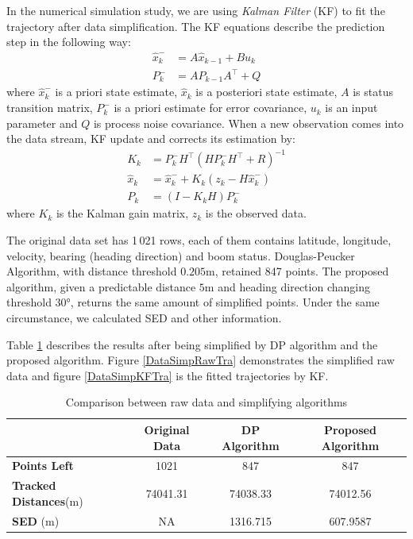 In the numerical simulation study, we are using \textit{Kalman Filter} (KF) to fit the trajectory after data simplification. The KF equations describe the prediction step in the following way: 
\begin{align*}
\hat{x}_k^-&=A\hat{x}_{k-1}+Bu_k \\
P_k^-&=AP_{k-1}A^\top+Q
\end{align*}
where $\hat{x}_k^-$ is a priori state estimate, $\hat{x}_k$ is a posteriori state estimate, $A$ is status transition matrix, $P_k^-$ is a priori estimate for error covariance, $u_k$ is an input parameter and $Q$ is process noise covariance. When a new observation comes into the data stream, KF update and corrects its estimation by: 
\begin{align*}
K_k&=P_k^-H^\top (HP_k^-H^\top+R)^{-1} \\
\hat{x}_k&=\hat{x}_k^-+K_k(z_k-H\hat{x}_k^-) \\
P_k&=(I-K_kH)P_k^-
\end{align*}
where $K_k$ is the Kalman gain matrix, $z_k$ is the observed data.


The original data set has 1\,021 rows, each of them contains latitude, longitude, velocity, bearing (heading direction) and boom status. Douglas-Peucker Algorithm, with distance threshold $0.205$m, retained 847 points. The proposed algorithm, given a predictable distance $5$m and heading direction changing threshold $\ang{30}$, returns the same amount of simplified points. Under the same circumstance, we calculated SED and other information. 

Table \ref{DataSimpCompTable} describes the results after being simplified by DP algorithm and the proposed algorithm. Figure \ref{DataSimpRawTra} demonstrates the simplified raw data and figure \ref{DataSimpKFTra} is the fitted trajectories by KF. 

\begin{table}
\centering
\caption{Comparison between raw data and simplifying algorithms}
\label{DataSimpCompTable}
\begin{tabular}{|l|c|c|c|}
\hline 
  & \textbf{Original Data} & \textbf{DP Algorithm} & \textbf{Proposed Algorithm}  \\
\hline 
\textbf{Points Left} & 1021              & 847         & 847         \\
\hline 
\textbf{Tracked Distances}(m)  & 74041.31     & 74038.33    & 74012.56     \\
\hline 
\textbf{SED} (m)    & NA        & 1316.715    & 607.9587   \\
\hline 
\end{tabular}
\end{table}


